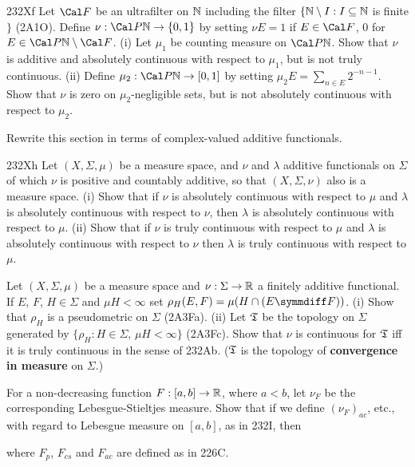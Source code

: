 {\spheader 232Xf Let $\Cal F$ be an ultrafilter on $\Bbb N$
including the filter $\{\Bbb N\setminus I:I\subseteq\Bbb N$ is
finite$\}$ (2A1O).    Define $\nu:\Cal P\Bbb N\to\{0,1\}$ by setting
$\nu E=1$ if $E\in\Cal F$, $0$ for $E\in\Cal P\Bbb N\setminus\Cal F$.
(i) Let $\mu_1$ be counting measure on $\Cal P\Bbb N$.   Show that $\nu$
is additive and absolutely continuous with respect to $\mu_1$, but is
not truly continuous.   (ii) Define $\mu_2:\Cal P\Bbb N\to[0,1]$ by
setting $\mu_2E=\sum_{n\in E}2^{-n-1}$.   Show that $\nu$ is zero on
$\mu_2$-negligible sets, but is not absolutely continuous with respect
to $\mu_2$.

 Rewrite this section in terms of complex-valued
additive functionals.

\spheader 232Xh Let $(X,\Sigma,\mu)$ be a measure space, and $\nu$ and
$\lambda$ additive functionals on $\Sigma$ of which $\nu$ is positive
and countably additive, so that $(X,\Sigma,\nu)$ also is a measure
space.   (i) Show that if $\nu$ is absolutely continuous with respect to
$\mu$ and $\lambda$ is absolutely continuous with respect to $\nu$, then
$\lambda$ is absolutely continuous with respect to $\mu$.   (ii) Show
that if $\nu$ is truly continuous with respect to $\mu$ and $\lambda$ is
absolutely continuous with respect to $\nu$ then $\lambda$ is truly
continuous with respect to $\mu$.

 Let $(X,\Sigma,\mu)$ be a measure
space and $\nu:\Sigma\to\Bbb R$ a finitely additive functional.   If
$E$, $F$, $H\in\Sigma$ and $\mu H<\infty$ set
$\rho_H(E,F)=\mu(H\cap(E\symmdiff F))$.   (i) Show that $\rho_H$ is a
pseudometric on $\Sigma$ (2A3Fa).   (ii)
Let $\frak T$ be the topology on $\Sigma$ generated by
$\{\rho_H:H\in\Sigma,\,\mu H<\infty\}$ (2A3Fc).   Show that $\nu$ is
continuous for $\frak T$
iff it is truly continuous in the sense of 232Ab.
($\frak T$ is the topology of {\bf convergence in
measure} on $\Sigma$.)

 For a non-decreasing function
$F:[a,b]\to\Bbb R$, where $a<b$,
let $\nu_F$ be the corresponding Lebesgue-Stieltjes measure.   Show that
if we define
$(\nu_F)_{ac}$, etc., with regard to Lebesgue measure on $[a,b]$, as in
232I, then


\noindent where $F_p$, $F_{cs}$ and $F_{ac}$ are defined as in 226C.

}
